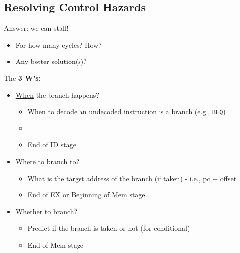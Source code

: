 \documentclass[10pt]{article}
\begin{document}
\subsection*{Resolving Control Hazards}
Answer: we can stall!
\begin{itemize}
    \item For how many cycles?  How?
    \item Any better solution(s)?
\end{itemize}
The \textbf{3 W's:}
\begin{itemize}
    \item \underline{When} the branch happens?
    \begin{itemize}
        \item When to decode an undecoded instruction is a branch (e.g., \texttt{BEQ})
        \item \item End of ID stage
    \end{itemize}
    \item \underline{Where} to branch to?
    \begin{itemize}
        \item What is the target address of the branch (if taken) - i.e., pc + offset
        \item End of EX or Beginning of Mem stage
    \end{itemize}
    \item \underline{Whether} to branch?
    \begin{itemize}
        \item Predict if the branch is taken or not (for conditional)
        \item End of Mem stage
    \end{itemize}
\end{itemize}
\end{document}
